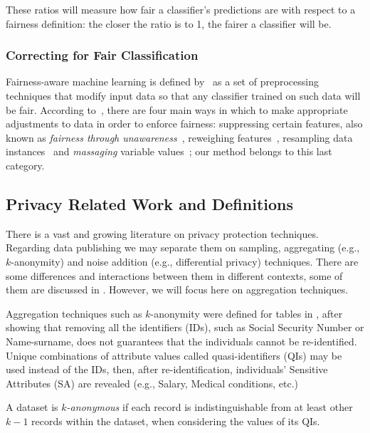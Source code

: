 These ratios will measure how fair a classifier's predictions are with respect to a fairness definition: the closer the ratio is to 1, the fairer a classifier will be.

\subsubsection{Correcting for Fair Classification}

Fairness-aware machine learning is defined by~\cite{friedler2019comparative} as a set of preprocessing techniques that modify input data so that any classifier trained on such data will be fair. According to~\cite{kamiran2012data}, there are four main ways in which to make appropriate adjustments to data in order to enforce fairness: suppressing certain features, also known as \emph{fairness through unawareness}~\cite{gajane2017formalizing},  reweighing features~\cite{krasanakis2018adaptive}, resampling data instances~\cite{rubin1973use,kamiran2010classification,salimi2019capuchin,zelaya2019parametrised} and \emph{massaging} variable values~\cite{chiappa2018path}; our method belongs to this last category.

\subsection{Privacy Related Work and Definitions}

There is a vast and growing literature on privacy protection techniques. 
Regarding data publishing we may separate them on sampling, aggregating (e.g., $k$-anonymity) and noise addition (e.g., differential privacy) techniques. There are some differences and interactions between them in different contexts, some of them are discussed in \cite{Salas:2018}. However, we will focus here on aggregation techniques.

Aggregation techniques such as $k$-anonymity were defined for tables in \cite{Samarati:2001,Sweeney:2002}, after showing that removing all the identifiers (IDs), such as Social Security Number or Name-surname, does not guarantees that the individuals cannot be re-identified. Unique combinations of attribute values called quasi-identifiers (QIs) may be used instead of the IDs, then, after re-identification, individuals' Sensitive Attributes (SA) are revealed (e.g., Salary, Medical conditions, etc.) 

\begin{definition}[$k$-Anonymity]
A dataset is \emph{$k$-anonymous} if each record is indistinguishable from at least other $k - 1$ records within the dataset, when considering the values of its QIs. 
\end{definition}

